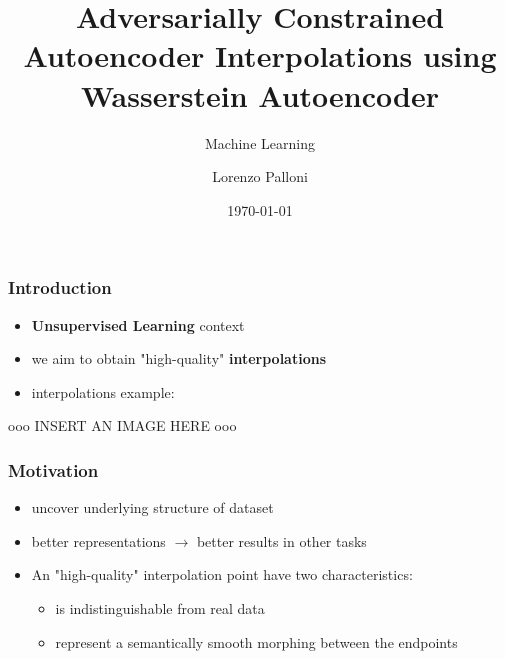 \documentclass{beamer}
\title[ML - 2019/20 - Lorenzo Palloni]{Adversarially Constrained Autoencoder Interpolations using Wasserstein Autoencoder}
\subtitle{Machine Learning}
\author{Lorenzo Palloni}
\institute[]{
    University of Florence\\
    \medskip
    \textit{lorenzo.palloni@stud.unifi.it }
}
\date{\today}
\begin{document}
\begin{frame}
\titlepage %
\end{frame}

\begin{frame}
\frametitle{Introduction}
  \begin{itemize}
    \item \textbf{Unsupervised Learning} context
    \item we aim to obtain "high-quality" \textbf{interpolations}
    \item interpolations example:
\end{itemize}
    ooo INSERT AN IMAGE HERE ooo
\end{frame}
\begin{frame}
\frametitle{Motivation}
  \begin{itemize}
    \item uncover underlying structure of dataset
    \item better representations $\rightarrow$ better results in other tasks
  \end{itemize}
\end{frame}
\begin{frame}
  \begin{itemize}
    \item An "high-quality" interpolation point have two characteristics:
    \medskip
      \begin{itemize}
        \item is indistinguishable from real data
        \medskip
        \item represent a semantically smooth morphing between the endpoints
      \end{itemize}
  \end{itemize}
\end{frame}
\end{document}
